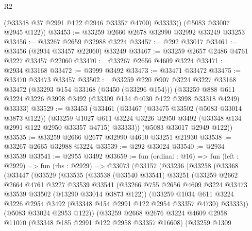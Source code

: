 \begin{lexlean}{R2}
\begin{coremodule}
          (@33348 @37 @2991 @122 @2946 @33357 @4700)
          @33333))
      (@5083 @33007 @2945 @122))
@33453 := @33259 @2660 @2678 @32990 @32992 @33249 @33253
@33456 := @33267 @2659 @32988 @3224
@33457 := @292 @33017
@33461 := @33456 (@2934 @33457 @22060) @33249
@33467 := @33259 @2657 @2486 @4761 @3227 @33457 @22060
@33470 := @33267 @2656 @4609 @3224
@33471 := @2934 @33168
@33472 := @3999 @3492
@33473 := @33471 @33472
@33475 := @33470 @33473 @33457
@33502 := @33259
    @220
    @907
    @3224
    @3227
    @33168
    @33472
    (@33293 @154 @33168 (@3450 (@33296 @154)))
    (@33259 @888 @611 @3224 @3226 @3998 @3492 (@33309 @134 @4030 @122 @3998 @33318 @4249) @33333)
@33529 := @33453
    (@33461
      (@33467
        (@33475 @33502 (@5083 @33014 @3873 @122))
        (@33259
          @1027
          @611
          @3224
          @3226
          @2950
          @3492
          (@33348 @134 @2991 @122 @2950 @33357 @4715)
          @33333))
      (@5083 @33017 @2949 @122))
@33535 := @33259 @2666 @2677 @32990 @4610 @33251 @21930
@33538 := @33267 @2665 @32988 @3224
@33539 := @292 @33024
@33540 := @2934 @33539
@33541 := @2955 @3492
@33659 := fun (ordinal : @16) =>
  fun (left : @2929) =>
  fun (rhs : @2929) =>
  @33073
    (@33157
      (@33236
        (@33258
          (@33368
            (@33447
              (@33529
                (@33535
                  (@33538
                    (@33540 @33541)
                    @33251
                    (@33259
                      @2662
                      @2664
                      @4761
                      @3227
                      @33539
                      @33541
                      (@33266
                        @755
                        @2656
                        @4609
                        @3224
                        @33473
                        @33539
                        @33502
                        (@13290 @33014 @3873 @122))
                      (@33259
                        @1034
                        @611
                        @3224
                        @3226
                        @2954
                        @3492
                        (@33348 @154 @2991 @122 @2954 @33357 @4730)
                        @33333))
                    (@5083 @33024 @2953 @122))
                  (@33259
                    @2668
                    @2676
                    @3224
                    @4609
                    @2958
                    @11070
                    (@33348 @185 @2991 @122 @2958 @33357 @16608)
                    (@33259
                      @1309

\end{coremodule}
\end{lexlean}
